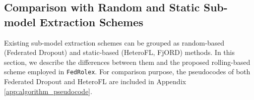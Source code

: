 \documentclass{article}
\begin{document}
\subsection{Comparison with Random and Static Sub-model Extraction Schemes}



Existing sub-model extraction schemes can be grouped as random-based (Federated Dropout) and static-based (HeteroFL, FjORD) methods. In this section, we describe the differences between them and the proposed rolling-based scheme employed in \texttt{FedRolex}. 
%
For comparison purpose, the pseudocodes of both Federated Dropout and HeteroFL are included in Appendix \ref{app:algorithm_pseudocode}.


\end{document}
